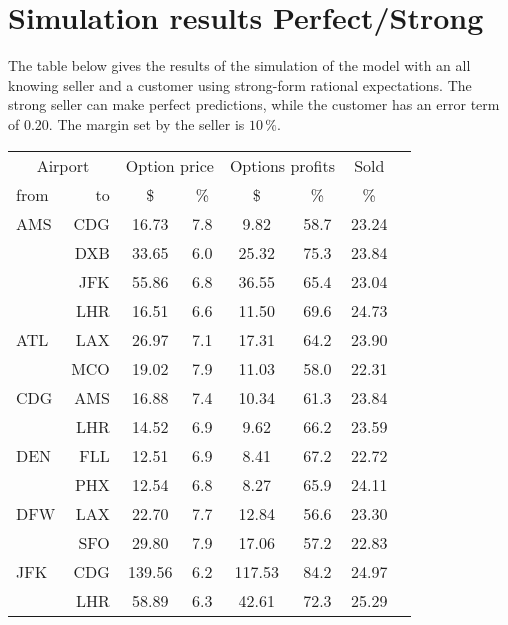 \chapter{Simulation results Perfect/Strong}
\label{app:SimulationResultsPerfectStrong}
The table below gives the results of the simulation of the model with an all knowing seller and a customer using strong-form rational expectations. The strong seller can make perfect predictions, while the customer has an error term of $0.20$. The margin set by the seller is $10\,\%$.
\\[2em]
\begin{table}[h]
    \small
    \begin{center}
        \begin{tabular}{l r c c c c c c}
            \toprule
            \multicolumn{2}{c}{Airport}  & \multicolumn{2}{c}{Option price} & \multicolumn{2}{c}{Options profits}  &  Sold  \\[.4ex]
            from  &  to  &  \$  & \%  &  \$  & \%  & \%  \\
            \midrule
AMS  &  CDG &   16.73  &     7.8  &    9.82  &    58.7  &   23.24  \\
     &  DXB &   33.65  &     6.0  &   25.32  &    75.3  &   23.84  \\
     &  JFK &   55.86  &     6.8  &   36.55  &    65.4  &   23.04  \\
     &  LHR &   16.51  &     6.6  &   11.50  &    69.6  &   24.73  \\[.5ex]
ATL  &  LAX &   26.97  &     7.1  &   17.31  &    64.2  &   23.90  \\
     &  MCO &   19.02  &     7.9  &   11.03  &    58.0  &   22.31  \\[.5ex]
CDG  &  AMS &   16.88  &     7.4  &   10.34  &    61.3  &   23.84  \\
     &  LHR &   14.52  &     6.9  &    9.62  &    66.2  &   23.59  \\[.5ex]
DEN  &  FLL &   12.51  &     6.9  &    8.41  &    67.2  &   22.72  \\
     &  PHX &   12.54  &     6.8  &    8.27  &    65.9  &   24.11  \\[.5ex]
DFW  &  LAX &   22.70  &     7.7  &   12.84  &    56.6  &   23.30  \\
     &  SFO &   29.80  &     7.9  &   17.06  &    57.2  &   22.83  \\[.5ex]
JFK  &  CDG &  139.56  &     6.2  &  117.53  &    84.2  &   24.97  \\
     &  LHR &   58.89  &     6.3  &   42.61  &    72.3  &   25.29  \\[.5ex]

\end{tabular}
\end{center}
\end{table}

